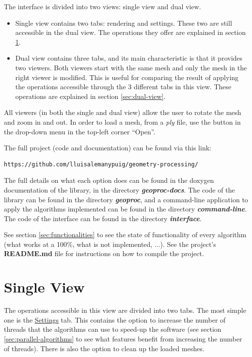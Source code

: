 \documentclass[12pt]{article}
\newcommand \dir[1] {\textbf{\textit{#1}}}
\newcommand \tabbox[1] {\underline{#1}}
\begin{document}
The interface is divided into two views: single view and dual view.
\begin{itemize}
	\item Single view contains two tabs: rendering and settings.
	These two are still accessible in the dual view. The operations
	they offer are explained in section \ref{sec:single-view}.
	
	\item Dual view contains three tabs, and its main characteristic
	is that it provides two viewers. Both viewers start with the same
	mesh and only the mesh in the right viewer is modified. This is
	useful for comparing the result of applying the operations accessible
	through the 3 different tabs in this view. These operations are
	explained in section \ref{sec:dual-view}.
\end{itemize}

All viewers (in both the single and dual view) allow the user to rotate
the mesh and zoom in and out. In order to load a mesh, from a \textit{ply}
file, use the button in the drop-down menu in the top-left corner ``Open''.

\hfill

The full project (code and documentation) can be found via this link:
\begin{verbatim}
https://github.com/lluisalemanypuig/geometry-processing/
\end{verbatim}
The full details on what each option does can be found in the doxygen
documentation of the library, in the directory \dir{geoproc-docs}.
The code of the library can be found in the directory \dir{geoproc},
and a command-line application to apply the algorithms implemented can
be found in the directory \dir{command-line}. The code of the
interface can be found in the directory \dir{interface}.

\hfill

See section \ref{sec:functionalities} to see the state of functionality
of every algorithm (what works at a 100\%, what is not implemented, ...).
See the project's \textbf{README.md} file for instructions on how to
compile the project.

\section{Single View}
\label{sec:single-view}

The operations accessible in this view are divided into two tabs.
The most simple one is the \tabbox{Settings} tab. This contains the
option to increase the number of threads that the algorithms can use
to speed-up the software (see section \ref{sec:parallel-algorithms}
to see what features benefit from increasing the number of threads).
There is also the option to clean up the loaded meshes.
\end{document}
